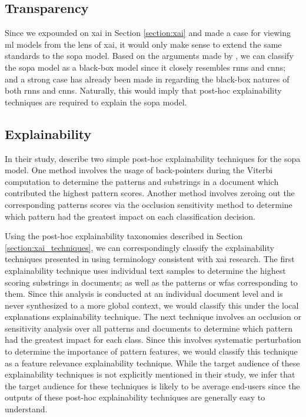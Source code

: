 \subsection{Transparency}

\label{section:sopa_transparency}

Since we expounded on \ac{xai} in Section \ref{section:xai} and made a case for
viewing \ac{ml} models from the lens of \ac{xai}, it would only make sense to extend the
same standards to the \ac{sopa} model. Based on the arguments made by
\citet{arrieta2020explainable}, we can classify the \ac{sopa} model as a black-box
model since it closely resembles \ac{rnn}s and \ac{cnn}s; and a strong case has already
been made in \citet{arrieta2020explainable} regarding the black-box natures of both \ac{rnn}s and \ac{cnn}s.
Naturally, this would imply that post-hoc explainability techniques are required to
explain the \ac{sopa} model.

\subsection{Explainability}

\label{section:sopa_post_hoc}

In their study, \citet[Page 7, Section 7]{schwartz2018sopa} describe two simple
post-hoc explainability techniques for the \ac{sopa} model. One method involves the
usage of back-pointers during the Viterbi computation to determine the patterns
and substrings in a document which contributed the highest pattern scores.
Another method involves zeroing out the corresponding patterns scores via the
occlusion sensitivity method to determine which pattern had the greatest impact
on each classification decision.

Using the post-hoc explainability taxonomies described in Section
\ref{section:xai_techniques}, we can correspondingly classify the explainability
techniques presented in \citet{schwartz2018sopa} using terminology consistent
with \ac{xai} research. The first explainability technique uses individual text
samples to determine the highest scoring substrings in documents; as well as the
patterns or \ac{wfas} corresponding to them. Since this analysis is conducted at
an individual document level and is never synthesized to a more global context,
we would classify this under the local explanations explainability technique.
The next technique involves an occlusion or sensitivity analysis over all
patterns and documents to determine which pattern had the greatest impact for
each class. Since this involves systematic perturbation to determine the
importance of pattern features, we would classify this technique as a feature
relevance explainability technique. While the target audience of these
explainability techniques is not explicitly mentioned in their study, we infer
that the target audience for these techniques is likely to be average end-users
since the outputs of these post-hoc explainability techniques are generally easy
to understand.

